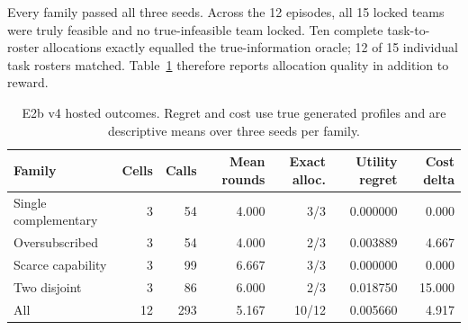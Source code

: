 \documentclass[11pt]{article}
\begin{document}
\begin{table}[ht]
\centering
\small
{}
\caption{E2b v4 stage accounting.  The promoted full manifest is cumulative:
it began with the two bound canary cells and dispatched only the other ten
using three cell workers.  Canary and promoted invocation wall times were
24.412 and 89.432 seconds, respectively.}
\label{tab:e2b-v4-stage}
\end{table}

Every family passed all three seeds.  Across the 12 episodes, all 15 locked
teams were truly feasible and no true-infeasible team locked.  Ten complete
task-to-roster allocations exactly equalled the true-information oracle;
12 of 15 individual task rosters matched.  Table~\ref{tab:e2b-v4-family}
therefore reports allocation quality in addition to reward.

\begin{table}[ht]
\centering
\small
\begin{tabular}{@{}lrrrrrr@{}}
\toprule
Family & Cells & Calls & Mean rounds & Exact alloc. & Utility regret & Cost delta\\
\midrule
Single complementary & 3 & 54 & 4.000 & 3/3 & 0.000000 & 0.000\\
Oversubscribed & 3 & 54 & 4.000 & 2/3 & 0.003889 & 4.667\\
Scarce capability & 3 & 99 & 6.667 & 3/3 & 0.000000 & 0.000\\
Two disjoint & 3 & 86 & 6.000 & 2/3 & 0.018750 & 15.000\\
\midrule
All & 12 & 293 & 5.167 & 10/12 & 0.005660 & 4.917\\
\bottomrule
\end{tabular}
\caption{E2b v4 hosted outcomes.  Regret and cost use true generated profiles
and are descriptive means over three seeds per family.}
\label{tab:e2b-v4-family}
\end{table}
\end{document}
